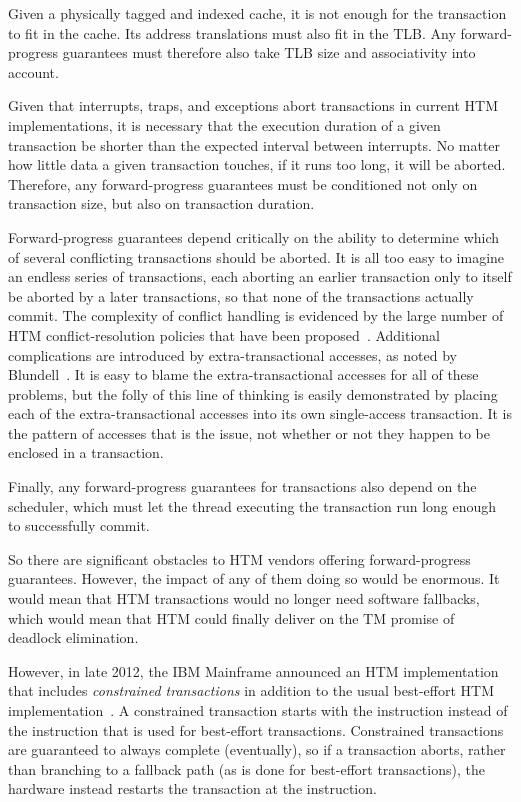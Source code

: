 Given a physically tagged and indexed cache, it is not enough for the
transaction to fit in the cache.
Its address translations must also fit in the TLB\@.
Any forward-progress guarantees must therefore also take TLB size
and associativity into account.

Given that interrupts, traps, and exceptions abort transactions in current
HTM implementations, it is necessary that the execution duration of
a given transaction be shorter than the expected interval between
interrupts.
No matter how little data a given transaction touches, if it runs too
long, it will be aborted.
Therefore, any forward-progress guarantees must be conditioned not only
on transaction size, but also on transaction duration.

Forward-progress guarantees depend critically on the ability to determine
which of several conflicting transactions should be aborted.
It is all too easy to imagine an endless series of transactions, each
aborting an earlier transaction only to itself be aborted by a later
transactions, so that none of the transactions actually commit.
The complexity of conflict handling is
evidenced by the large number of HTM conflict-resolution policies
that have been proposed~\cite{EgeAkpinar2011HTM2TLE,YujieLiu2011ToxicTransactions}.
Additional complications are introduced by extra-transactional accesses,
as noted by Blundell~\cite{Blundell2006TMdeadlock}.
It is easy to blame the extra-transactional accesses for all of these
problems, but the folly of this line of thinking is easily demonstrated
by placing each of the extra-transactional accesses into its own
single-access transaction.
It is the pattern of accesses that is the issue, not whether or not they
happen to be enclosed in a transaction.

Finally, any forward-progress guarantees for transactions also
depend on the scheduler, which must let the thread executing the
transaction run long enough to successfully commit.

So there are significant obstacles to HTM vendors offering forward-progress
guarantees.
However, the impact of any of them doing so would be enormous.
It would mean that HTM transactions would no longer need software
fallbacks, which would mean that HTM could finally deliver on the
TM promise of deadlock elimination.

However, in late 2012, the IBM Mainframe announced an HTM implementation
that includes \emph{constrained transactions} in addition to the usual
best-effort HTM
implementation~\cite{ChristianJacobi2012MainframeTM}.
A constrained transaction starts with the  instruction
instead of the  instruction that is used for best-effort
transactions.
Constrained transactions are guaranteed to always complete (eventually),
so if a transaction aborts, rather than branching to a fallback path
(as is done for best-effort transactions), the hardware instead restarts
the transaction at the  instruction.

